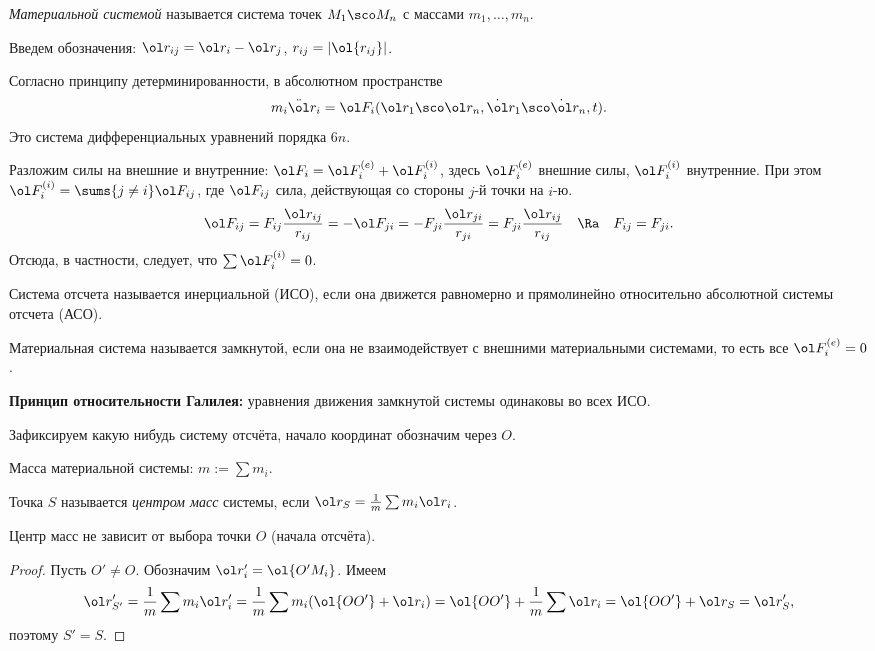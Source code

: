 \documentclass[a4paper,12pt]{article}
\def\F{\ol F}
\def\r{\ol r}
\def\dd{\ddot}
\def\d{\dot}
\begin{document}
\begin{df}
\emph{Материальной системой} называется система точек $M_1\sco M_n$ с массами
$m_1,\dots,m_n$.
\end{df}

Введем обозначения: $\r_{ij}=\r_i-\r_j$,
$r_{ij}=|\ol{r_{ij}}|$.

Согласно принципу детерминированности,  в
абсолютном пространстве
$$m_i\dd\r_i=\F_i(\r_1\sco \r_n,\d\r_1\sco \d\r_n,t).$$
Это система дифференциальных уравнений порядка $6n$.

Разложим силы на внешние и внутренние:
$\F_i=\F_i^{(e)}+\F_i^{(i)}$, здесь $\F_i^{(e)}$ внешние силы, $\F_i^{(i)}$ внутренние.
При этом $\F_i^{(i)}=\sums{j\ne i}\F_{ij}$, где
$\F_{ij}$ сила, действующая со стороны $j$-й точки на $i$-ю.
$$
\F_{ij}=F_{ij}\frac{\r_{ij}}{r_{ij}}=-\F_{ji}=
-F_{ji}\frac{\r_{ji}}{r_{ji}}=F_{ji}\frac{\r_{ij}}{r_{ij}}\quad\Ra\quad
F_{ij}=F_{ji}.
$$
Отсюда, в частности, следует,  что $\sum\F_i^{(i)}=0$.

\begin{df}
Система отсчета называется инерциальной (ИСО),
если она движется равномерно и прямолинейно относительно абсолютной
системы отсчета (АСО).
\end{df}

\begin{df}
Материальная система называется замкнутой,  если
она не взаимодействует с внешними материальными системами,
то есть все $\F_i^{(e)}=0$.
\end{df}

\textbf{Принцип относительности Галилея:} уравнения движения замкнутой
системы одинаковы во всех ИСО.

Зафиксируем какую нибудь систему отсчёта, начало координат обозначим через $O$.

\begin{df}
Масса материальной системы: $m:=\sum m_i$.
\end{df}

\begin{df}
Точка $S$ называется \emph{центром масс} системы, если $\r_S=\frac1m \sum m_i\r_i$.
\end{df}

\begin{stm}
Центр масс не зависит от выбора точки $O$ (начала отсчёта).
\end{stm}
\begin{proof}
Пусть $O'\ne O$. Обозначим
$\r'_i=\ol{O'M_i}$.
Имеем
$$\r'_{S'}=\frac1m \sum m_i\r'_i=\frac1m\sum m_i(\ol{OO'}+\r_i)=\ol{OO'}+\frac1m\sum\r_i = \ol{OO'} + \r_S=\r'_S,$$
поэтому $S'=S$.
\end{proof}
\end{document}
